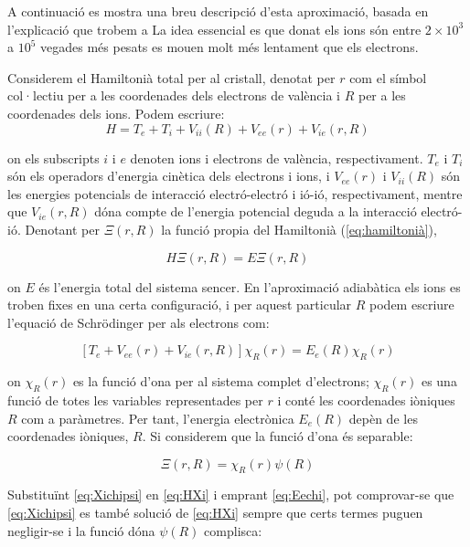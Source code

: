 \documentclass[12pt]{article} %
\begin{document}
A continuació es mostra una breu descripció d'esta aproximació, basada en l'explicació que trobem a \cite{brueesch82_phonon}
La idea essencial es que donat els ions són entre $2\times 10^3$ a $10^5$ vegades més pesats es mouen molt més lentament que els electrons.

Considerem el Hamiltonià total per al cristall, denotat per $r$ com el símbol col·lectiu per a les coordenades dels electrons de valència i $R$ per a les coordenades dels ions. Podem escriure:
\begin{equation}
\label{eq:hamiltonià}
 H=T_e+T_i+V_{ii}(R)+V_{ee}(r)+V_{ie}(r,R)
\end{equation}

on els subscripts $i$ i $e$ denoten ions i electrons de valència, respectivament. $T_e$ i $T_i$ són els operadors d'energia cinètica dels electrons i ions, i $V_{ee}(r)$ i $V_{ii}(R)$ són les energies potencials de interacció electró-electró i ió-ió, respectivament, mentre que $V_{ie}(r,R)$ dóna compte de l'energia potencial deguda a la interacció electró-ió. Denotant per $\Xi(r,R)$ la funció propia del Hamiltonià (\ref{eq:hamiltonià}),

\begin{equation}
\label{eq:HXi}
 H\Xi(r,R)=E\Xi(r,R)
\end{equation}

on $E$ és l'energia total del sistema sencer. En l'aproximació adiabàtica els ions es troben fixes en una certa configuració, i per aquest particular $R$ podem escriure l'equació de Schrödinger per als electrons com:

\begin{equation}
\label{eq:Eechi}
 \left[T_e+V_{ee}(r) + V_{ie}(r,R)\right]\chi_R(r)=E_e(R)\chi_R(r)
\end{equation}

on $\chi_R(r)$ es la funció d'ona per al sistema complet d'electrons; $\chi_R(r)$ es una funció de totes les variables representades per $r$ i conté les coordenades iòniques $R$ com a paràmetres. Per tant, l'energia electrònica $E_e(R)$ depèn de les coordenades iòniques, $R$.
Si considerem que la funció d'ona és separable:

\begin{equation}
\label{eq:Xichipsi}
 \Xi(r,R)=\chi_R(r)\psi(R)
\end{equation}

Substituïnt \ref{eq:Xichipsi} en \ref{eq:HXi} i emprant \ref{eq:Eechi}, pot comprovar-se que \ref{eq:Xichipsi} es també solució de \ref{eq:HXi} sempre que certs termes puguen negligir-se i la funció dóna $\psi(R)$ complisca:
\end{document}
